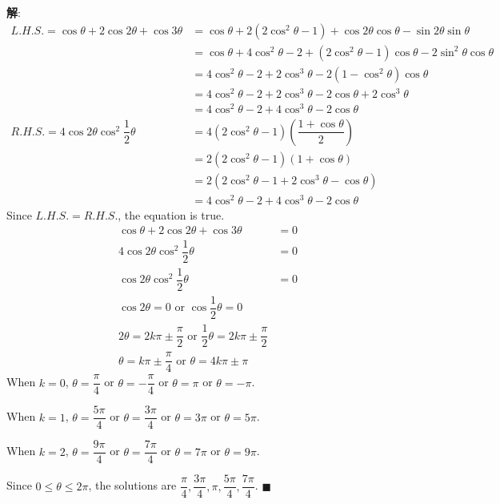 \documentclass{report}
\newcommand{\sol}{\vspace{0.2cm}\textbf{解}:}
\begin{document}
\begin{enumerate}[leftmargin=*]
        \sol{}
        \begin{align*}
            L.H.S. = \cos \theta+2 \cos 2 \theta+\cos 3 \theta & = \cos \theta + 2(2\cos^2\theta - 1) + \cos 2\theta\cos\theta - \sin 2\theta\sin\theta\\
            & = \cos \theta + 4\cos^2\theta - 2 + (2\cos^2\theta - 1)\cos\theta - 2\sin^2\theta\cos\theta\\
            & = 4\cos^2\theta - 2 + 2\cos^3\theta - 2(1 - \cos^2\theta)\cos\theta\\
            & = 4\cos^2\theta - 2 + 2\cos^3\theta - 2\cos\theta + 2\cos^3\theta\\
            & = 4\cos^2\theta - 2 + 4\cos^3\theta - 2\cos\theta\\
            R.H.S. = 4 \cos 2 \theta \cos ^2 \dfrac{1}{2} \theta & = 4(2\cos^2\theta - 1)\left(\dfrac{1 + \cos\theta}{2}\right)\\
            & = 2(2\cos^2\theta - 1)(1 + \cos\theta)\\
            & = 2(2\cos^2\theta - 1 + 2\cos^3\theta - \cos\theta)\\
            & = 4\cos^2\theta - 2 + 4\cos^3\theta - 2\cos\theta
        \end{align*}
        Since $L.H.S. = R.H.S.$, the equation is true.
        \begin{align*}
            \cos \theta+2 \cos 2 \theta+\cos 3 \theta &= 0\\
            4\cos 2\theta\cos^2\dfrac{1}{2}\theta &= 0\\
            \cos 2\theta\cos^2\dfrac{1}{2}\theta &= 0\\
            \cos 2\theta = 0 \text{ or } \cos\dfrac{1}{2}\theta = 0\\
            2\theta = 2k\pi \pm \dfrac{\pi}{2} \text{ or } \dfrac{1}{2}\theta = 2k\pi \pm \dfrac{\pi}{2}\\
            \theta = k\pi \pm \dfrac{\pi}{4} \text{ or } \theta = 4k\pi \pm \pi
        \end{align*}
        When $k = 0$, $\theta = \dfrac{\pi}{4}$ or $\theta = -\dfrac{\pi}{4}$ or $\theta = \pi$ or $\theta = -\pi$.

        When $k = 1$, $\theta = \dfrac{5\pi}{4}$ or $\theta = \dfrac{3\pi}{4}$ or $\theta = 3\pi$ or $\theta = 5\pi$.

        When $k = 2$, $\theta = \dfrac{9\pi}{4}$ or $\theta = \dfrac{7\pi}{4}$ or $\theta = 7\pi$ or $\theta = 9\pi$.

        Since $0 \leq \theta \leq 2\pi$, the solutions are $\dfrac{\pi}{4}, \dfrac{3\pi}{4}, \pi, \dfrac{5\pi}{4}, \dfrac{7\pi}{4}$. \hfill $\blacksquare$


\end{enumerate}
\end{document}

